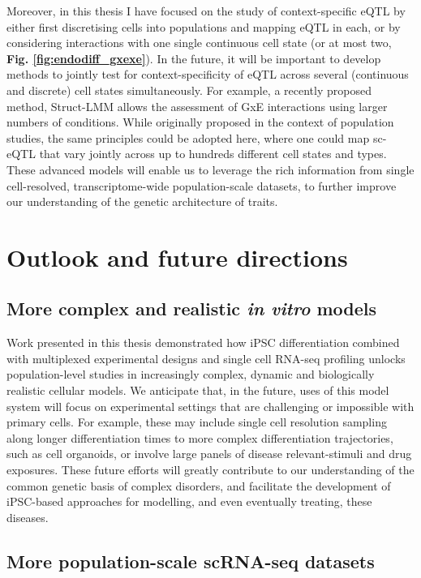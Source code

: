 Moreover, in this thesis I have focused on the study of context-specific eQTL by either first discretising cells into populations and mapping eQTL in each, or by considering interactions with one single continuous cell state (or at most two, \textbf{Fig. 
\ref{fig:endodiff_gxexe}}).
In the future, it will be important to develop methods to jointly test for context-specificity of eQTL across several (continuous and discrete) cell states simultaneously.
For example, a recently proposed method, Struct-LMM \cite{moore2019linear} allows the assessment of GxE interactions using larger numbers of conditions.
While originally proposed in the context of population studies, the same principles could be adopted here, where one could map sc-eQTL that vary jointly across up to hundreds different cell states and types. 
These advanced models will enable us to leverage the rich information from single cell-resolved, transcriptome-wide population-scale datasets, to further improve our understanding of the genetic architecture of traits.


\section{Outlook and future directions}

\subsection{More complex and realistic \textit{in vitro} models}

Work presented in this thesis demonstrated how iPSC differentiation combined with multiplexed experimental designs and single cell RNA-seq profiling unlocks population-level studies in increasingly complex, dynamic and biologically realistic cellular models. 
We anticipate that, in the future, uses of this model system will focus on experimental settings that are challenging or impossible with primary cells. 
For example, these may include single cell resolution sampling along longer differentiation times to more complex differentiation trajectories, such as cell organoids, or involve large panels of disease relevant-stimuli and drug exposures. 
These future efforts will greatly contribute to our understanding of the common genetic basis of complex disorders, and facilitate the development of iPSC-based approaches for modelling, and even eventually treating, these diseases. 

\subsection{More population-scale scRNA-seq datasets}

